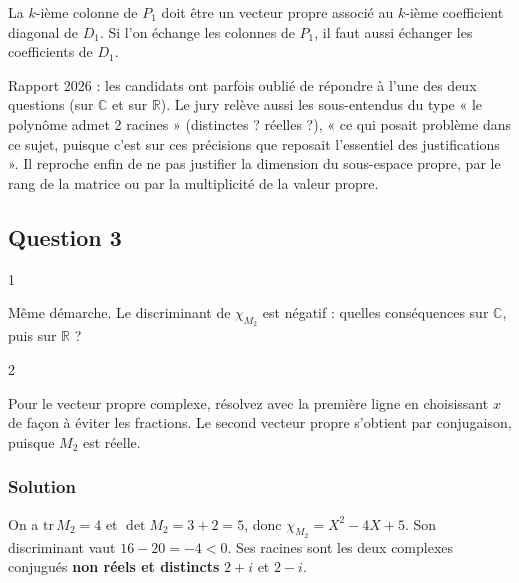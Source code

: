 \documentclass[11pt,a4paper]{article}
\begin{document}
\begin{piege}

La \(k\)-ième colonne de \(P_1\) doit être un vecteur propre associé au \(k\)-ième coefficient diagonal de \(D_1\). Si l'on échange les colonnes de \(P_1\), il faut aussi échanger les coefficients de \(D_1\).

\end{piege}

\begin{jury}

Rapport 2026 : les candidats ont parfois oublié de répondre à l'une des deux questions (sur \(\mathbb{C}\) et sur \(\mathbb{R}\)). Le jury relève aussi les sous-entendus du type « le polynôme admet 2 racines » (distinctes ? réelles ?), « ce qui posait problème dans ce sujet, puisque c'est sur ces précisions que reposait l'essentiel des justifications ». Il reproche enfin de ne pas justifier la dimension du sous-espace propre, par le rang de la matrice ou par la multiplicité de la valeur propre.

\end{jury}

\hypertarget{question-3}{%
\subsection{Question 3}\label{question-3}}

\begin{indication}{1}

Même démarche. Le discriminant de \(\chi_{M_2}\) est négatif : quelles conséquences sur \(\mathbb{C}\), puis sur \(\mathbb{R}\) ?

\end{indication}

\begin{indication}{2}

Pour le vecteur propre complexe, résolvez avec la première ligne en choisissant \(x\) de façon à éviter les fractions. Le second vecteur propre s'obtient par conjugaison, puisque \(M_2\) est réelle.

\end{indication}

\hypertarget{solution-2}{%
\subsubsection{Solution}\label{solution-2}}

On a \(\mathrm{tr}\,M_2=4\) et \(\det M_2=3+2=5\), donc \(\chi_{M_2}=X^2-4X+5\). Son discriminant vaut \(16-20=-4<0\). Ses racines sont les deux complexes conjugués \textbf{non réels et distincts} \(2+i\) et \(2-i\).
\end{document}
